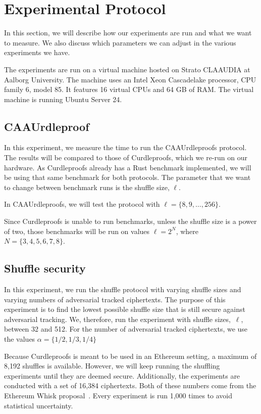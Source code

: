
\section{Experimental Protocol}\label{sec:experimental-protocol}
In this section, we will describe how our experiments are run and what we want to measure.
We also discuss which parameters we can adjust in the various experiments we have.

The experiments are run on a virtual machine hosted on Strato CLAAUDIA at Aalborg University.
The machine uses an Intel Xeon Cascadelake processor, CPU family 6, model 85.
It features 16 virtual CPUs and 64 GB of RAM\@.
The virtual machine is running Ubuntu Server 24.


\subsection{CAAUrdleproof}\label{sec:CAAUrdleproof-experiment}
In this experiment, we measure the time to run the CAAUrdleproofs protocol.
The results will be compared to those of Curdleproofs, which we re-run on our hardware.
As Curdleproofs already has a Rust benchmark implemented, we will be using that same benchmark for both protocols.
The parameter that we want to change between benchmark runs is the shuffle size, $\ell$.

In CAAUrdleproofs, we will test the protocol with $\ell=\{8,9,\dots,256\}$.

Since Curdleproofs is unable to run benchmarks, unless the shuffle size is a power of two, those benchmarks will be run on values $\ell=2^N$, where $N=\{3,4,5,6,7,8\}$.




\subsection{Shuffle security}\label{subsec:experimental-protocol-shuffle-security}
In this experiment, we run the shuffle protocol with varying shuffle sizes and varying numbers of adversarial tracked ciphertexts.
The purpose of this experiment is to find the lowest possible shuffle size that is still secure against adversarial tracking.
We, therefore, run the experiment with shuffle sizes,~$\ell$, between 32 and 512.
For the number of adversarial tracked ciphertexts, we use the values $\alpha=\{1/2,1/3,1/4\}$

Because Curdleproofs is meant to be used in an Ethereum setting, a maximum of 8,192 shuffles is available.
However, we will keep running the shuffling experiments until they are deemed secure.
Additionally, the experiments are conducted with a set of 16,384 ciphertexts.
Both of these numbers come from the Ethereum Whisk proposal~\cite{Whisk2024}.
Every experiment is run 1,000 times to avoid statistical uncertainty.